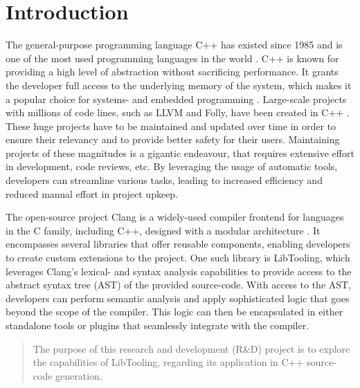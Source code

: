 \chapter{Introduction}

The general-purpose programming language C++ has existed since 1985 and is one of the most used programming languages in the world \cite{nexttechnologyprofessionalsMostPopularProgramming2022}.
C++ is known for providing a high level of abstraction without sacrificing performance.
It grants the developer full access to the underlying memory of the system, which makes it a popular choice for systems- and embedded programming  \cite{nitacademyWhereUsedIndustry2021}.
Large-scale projects with millions of code lines, such as LLVM and Folly, have been created in C++ \cite{llvmLLVMCompilerInfrastructure, facebookFollyFacebookOpensource2023}.
These huge projects have to be maintained and updated over time in order to ensure their relevancy and to provide better safety for their users.
Maintaining projects of these magnitudes is a gigantic endeavour, that requires extensive effort in development, code reviews, etc.
By leveraging the usage of automatic tools, developers can streamline various tasks, leading to increased efficiency and reduced manual effort in project upkeep.

The open-source project Clang is a widely-used compiler frontend for languages in the C family, including C++, designed with a modular architecture \cite{clangClangLanguageFamily}.
It encompasses several libraries that offer reusable components, enabling developers to create custom extensions to the project.
One such library is LibTooling, which leverages Clang's lexical- and syntax analysis capabilities to provide access to the abstract syntax tree (AST) of the provided source-code.
With access to the AST, developers can perform semantic analysis and apply sophisticated logic that goes beyond the scope of the compiler.
This logic can then be encapsulated in either standalone tools or plugins that seamlessly integrate with the compiler.

\begin{quote}
    The purpose of this research and development (R\&D) project is to explore the capabilities of LibTooling, regarding its application in C++ source-code generation.
\end{quote}

